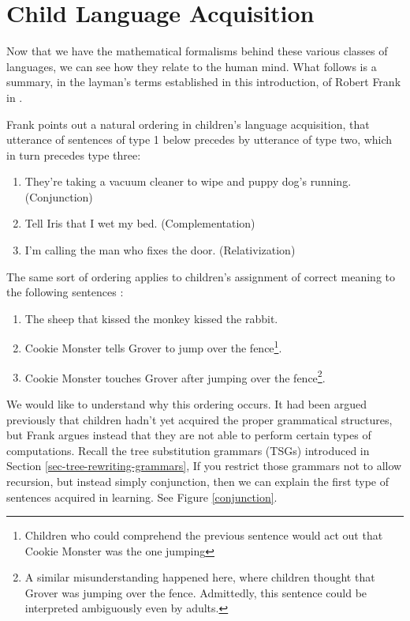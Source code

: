 \documentclass[12pt]{article}
\begin{document}
\section{Child Language Acquisition}

Now that we have the mathematical formalisms behind these various
classes of languages, we can see how they relate to the human mind.
What follows is a summary, in the layman's terms established in this
introduction, of Robert Frank in \cite{Frank-2000}.

Frank points out a natural ordering in children's language acquisition,
that utterance of sentences of type 1 below precedes by utterance of
type two, which in turn precedes type three:

\begin{enumerate}
\item They're taking a vacuum cleaner to wipe and puppy dog's
running.  (Conjunction)
\item Tell Iris that I wet my bed. (Complementation)
\item I'm calling the man who fixes the door.  (Relativization)
\end{enumerate}

The same sort of ordering applies to children's assignment of correct
meaning to the following sentences \cite{Bloom-1980}:

\begin{enumerate}
\item The sheep that kissed the monkey kissed the rabbit.
\item Cookie Monster tells Grover to jump over the
fence\footnote{Children who could comprehend the previous sentence would
act out that Cookie Monster was the one jumping}. 
\item Cookie Monster touches Grover after jumping over the
fence\footnote{A similar misunderstanding happened here, where children
thought that Grover was jumping over the fence.  Admittedly, this
sentence could be interpreted ambiguously even by adults.}.
\end{enumerate}

We would like to understand why this ordering occurs.  It had been
argued previously that children hadn't yet acquired the proper
grammatical structures, but Frank argues instead that they are not able
to perform certain types of computations.  Recall the tree substitution
grammars (TSGs) introduced in Section \ref{sec-tree-rewriting-grammars},
If you restrict those grammars not to allow recursion, but instead
simply conjunction, then we can explain the first type of sentences
acquired in learning.  See Figure \ref{conjunction}.
\end{document}
